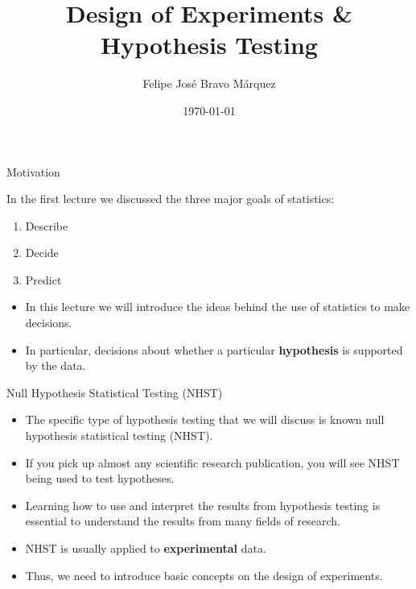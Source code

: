 \documentclass[handout]{beamer}
\title{Design of Experiments \& Hypothesis Testing}
\author[Felipe Bravo Márquez]{\footnotesize
 \textcolor[rgb]{0.00,0.00,1.00}{Felipe José Bravo Márquez}}
\date{ \today }
\begin{document}
\begin{frame}
\titlepage


\end{frame}





\begin{frame}{Motivation}
\scriptsize{


In the first lecture we discussed the three major goals of statistics:
\begin{enumerate}
 \item Describe
 \item Decide
 \item Predict 
\end{enumerate}



 \begin{itemize}
  \item In this lecture we will introduce the ideas behind the use of statistics to make decisions.
  \item In particular, decisions about whether a particular \textbf{hypothesis} is supported by the data. \cite{poldrack2019statistical}
 \end{itemize}

} 
\end{frame}



\begin{frame}{Null Hypothesis Statistical Testing (NHST)}
\scriptsize{
\begin{itemize}
 \item The specific type of hypothesis testing that we will discuss is known null hypothesis statistical testing (NHST).
\item  If you pick up almost any scientific research publication, you will see NHST being used to test hypotheses.
\item Learning how to use and interpret the results from hypothesis testing is essential to understand the results from many fields of research.
\item NHST is usually applied to \textbf{experimental} data.
\item Thus, we need to introduce basic concepts on the design of experiments.
\end{itemize}



} 
\end{frame}
\end{document}
